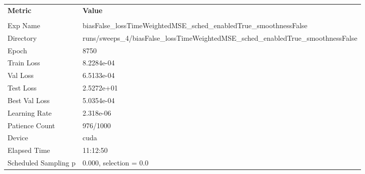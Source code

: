 \begin{tabular}{|l|l|}
\hline
\textbf{Metric} & \textbf{Value} \\\\
Exp Name & biasFalse_lossTimeWeightedMSE_sched_enabledTrue_smoothnessFalse \\ 
Directory & runs/sweeps_4/biasFalse_lossTimeWeightedMSE_sched_enabledTrue_smoothnessFalse \\ 
Epoch & 8750 \\ 
Train Loss & 8.2284e-04 \\ 
Val Loss & 6.5133e-04 \\ 
Test Loss & 2.5272e+01 \\ 
Best Val Loss & 5.0354e-04 \\ 
Learning Rate & 2.318e-06 \\ 
Patience Count & 976/1000 \\ 
Device & cuda \\ 
Elapsed Time & 11:12:50 \\ 
Scheduled Sampling p & 0.000, selection = 0.0 \\ 
\hline
\end{tabular}